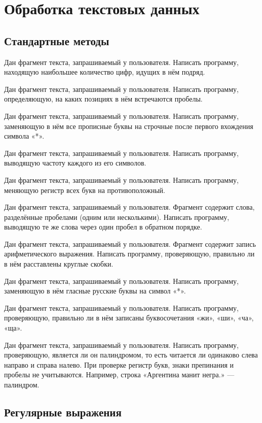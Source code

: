 \section{Обработка текстовых данных}

\subsection{Стандартные методы}

\task Дан фрагмент текста, запрашиваемый у пользователя. Написать
программу, находящую наибольшее количество цифр, идущих в нём подряд.

\task Дан фрагмент текста, запрашиваемый у пользователя. Написать
программу, определяющую, на каких позициях в нём встречаются пробелы.

\task Дан фрагмент текста, запрашиваемый у пользователя. Написать
программу, заменяющую в нём все прописные буквы на строчные после
первого вхождения символа «*».

\task Дан фрагмент текста, запрашиваемый у пользователя. Написать
программу, выводящую частоту каждого из его символов.

\task Дан фрагмент текста, запрашиваемый у пользователя. Написать
программу, меняющую регистр всех букв на противоположный.

\task Дан фрагмент текста, запрашиваемый у пользователя. Фрагмент
содержит слова, разделённые пробелами (одним или несколькими).
Написать программу, выводящую те же слова через один пробел в
обратном порядке.

\task Дан фрагмент текста, запрашиваемый у пользователя. Фрагмент
содержит запись арифметического выражения. Написать программу,
проверяющую, правильно ли в нём расставлены круглые скобки.

\task Дан фрагмент текста, запрашиваемый у пользователя. Написать
программу, заменяющую в нём гласные русские буквы на символ «*».

\task Дан фрагмент текста, запрашиваемый у пользователя. Написать
программу, проверяющую, правильно ли в нём записаны буквосочетания
«жи», «ши», «ча», «ща».

\task Дан фрагмент текста, запрашиваемый у пользователя. Написать
программу, проверяющую, является ли он палиндромом, то есть читается
ли одинаково слева направо и справа налево. При
проверке регистр букв, знаки препинания и пробелы не
учитываются. Например, строка «Аргентина манит негра.» — палиндром.

\subsection{Регулярные выражения}


